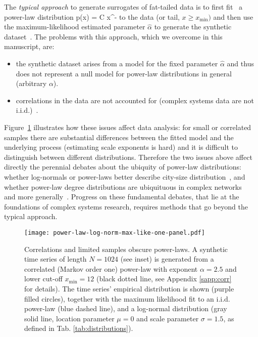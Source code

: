 \documentclass[%
prx,
reprint,
superscriptaddress,
nofootinbib,
 amsmath,amssymb,
 aps,
floatfix,
]{revtex4-2}
\let\oldequation\equation
\let\oldendequation\endequation
\renewenvironment{equation}{%
    \linenomathNonumbers\oldequation
    }{%
    \oldendequation\endlinenomath%
    }
\begin{document}
The {\it typical approach} to generate surrogates of fat-tailed data is to first fit~\cite{goldstein2004problems,bauke2007parameter,hanel2017fitting} a power-law distribution 
%
\begin{equation}\label{eq.powerlaw}
p(x) = C x^{-\alpha}
\end{equation}
to the data (or tail, $x \geq x_{\min})$ and then use the maximum-likelihood estimated parameter $\hat{\alpha}$ %
to generate the synthetic dataset~\cite{clauset2009power,deluca2013fitting,corral2019power}. The problems with this approach, which we overcome in this manuscript, are: 
\begin{itemize}
    \item the synthetic dataset arises from a model for the fixed parameter $\hat{\alpha}$ and thus does not represent a null model for power-law distributions in general (arbitrary $\alpha$).
   \item correlations in the data are not accounted for (complex systems data are not i.i.d.)~\cite{bramwell2000universal,corral2008scaling,gerlach2019testing}.
\end{itemize}
%
Figure~\ref{fig:fat_tails} illustrates how these issues affect data analysis: for small or correlated samples there are substantial differences between the fitted model and the underlying process (estimating scale exponents is hard) and it is difficult to distinguish between different distributions. 
Therefore the two issues above affect directly the perennial debates about the ubiquity of power-law distributions: whether log-normals or power-laws better describe city-size distribution~\cite{eeckhout2004gibrat,levy2009gibrat,eeckhout2009gibrat}, and whether power-law degree distributions are ubiquituous in complex networks~\cite{broido2019scale,voitalov2019scale,zhou2020power-law,falkenberg2020identifying,serafino2021true} and more generally~\cite{stumpf2012critical,holme2019rare,cirillo2020tail,corral2021tail}. Progress on these fundamental debates, that lie at the foundations of complex systems research, requires methods that go beyond the typical approach.  

\begin{figure}[htbp]
\centering
\texttt{[image: power-law-log-norm-max-like-one-panel.pdf]}

\caption{
Correlations and limited samples obscure power-laws. A synthetic time series of length $N = 1024$ (see inset) is generated from a correlated (Markov order one) power-law with exponent $\alpha = 2.5$ and lower cut-off $x_{\min} = 12$ (black dotted line, see Appendix \ref{sapp:corr} for details). The time series' empirical distribution is shown (purple filled circles), together with the maximum likelihood fit to an i.i.d. power-law (blue dashed line), and a log-normal distribution (gray solid line, location parameter $\mu = 0$ and scale parameter $\sigma = 1.5$, as defined in Tab. \ref{tab:distributions}).
}
\label{fig:fat_tails}
\end{figure}
\end{document}
